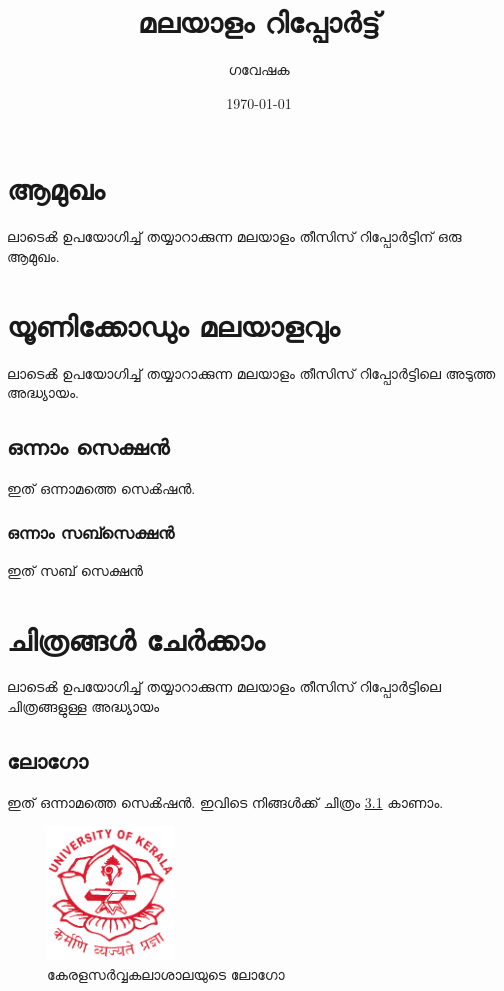 \documentclass[12pt]{report}
\title{മലയാളം റിപ്പോർട്ട്}
\author{ഗവേഷക}
\date{\today}
\begin{document}
\maketitle


\newpage



\tableofcontents


\chapter{ആമുഖം}
ലാടെൿ ഉപയോഗിച്ച് തയ്യാറാക്കുന്ന മലയാളം തീസിസ് റിപ്പോർട്ടിന് ഒരു ആമുഖം.

\chapter{യൂണിക്കോഡും മലയാളവും}
ലാടെൿ ഉപയോഗിച്ച് തയ്യാറാക്കുന്ന മലയാളം തീസിസ് റിപ്പോർട്ടിലെ അടുത്ത അദ്ധ്യായം.

\section{ഒന്നാം സെക്ഷൻ}

ഇത് ഒന്നാമത്തെ സെൿഷൻ.

\subsection{ഒന്നാം സബ്സെക്ഷൻ}
ഇത് സബ് സെക്ഷൻ


\chapter{ചിത്രങ്ങൾ ചേർക്കാം}
ലാടെൿ ഉപയോഗിച്ച് തയ്യാറാക്കുന്ന മലയാളം തീസിസ് റിപ്പോർട്ടിലെ ചിത്രങ്ങളുള്ള അദ്ധ്യായം

\section{ലോഗോ}

ഇത് ഒന്നാമത്തെ സെൿഷൻ. ഇവിടെ നിങ്ങൾക്ക് ചിത്രം \ref{logo} കാണാം.

\begin{figure}
\center
\includegraphics[width=0.3\textwidth]{./contents/logo.png}
\caption{കേരളസർവ്വകലാശാലയുടെ ലോഗോ}
\label{logo}
\end{figure}
\end{document}
